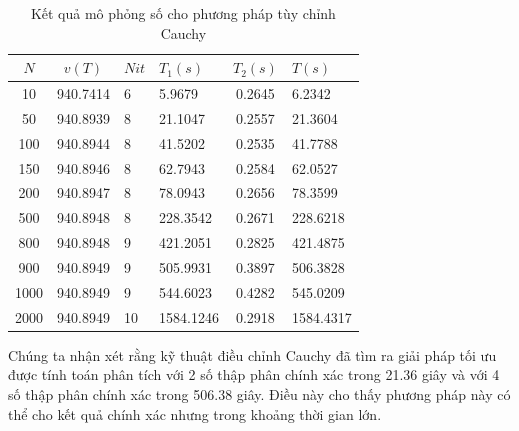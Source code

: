 \documentclass[12pt,a4paper]{report}
\begin{document}
\begin{table}[!htp]
	\centering
	\begin{tabular}{|c|c|l|l|c|l|}
		\hline
		$N$ & $v(T)$ & $Nit$ & $T_1(s)$ & $T_2(s)$ & $T(s)$ \\
		\hline
		10 & 940.7414 & 6 & 5.9679 & 0.2645 & 6.2342 \\
		\hline
		50 & 940.8939 & 8 & 21.1047 & 0.2557 & 21.3604 \\
		\hline
		100 & 940.8944 & 8 & 41.5202 & 0.2535 & 41.7788 \\
		\hline
		150 & 940.8946 & 8 & 62.7943 & 0.2584 & 62.0527 \\
		\hline
		200 & 940.8947 & 8 & 78.0943 & 0.2656 & 78.3599 \\
		\hline
		500 & 940.8948 & 8 & 228.3542 & 0.2671 & 228.6218 \\
		\hline
		800 & 940.8948 & 9 & 421.2051 & 0.2825 & 421.4875 \\
		\hline
		900 & 940.8949 & 9 & 505.9931 & 0.3897 & 506.3828 \\
		\hline
		1000 & 940.8949 & 9 & 544.6023 & 0.4282 & 545.0209 \\
		\hline
		2000 & 940.8949 & 10 & 1584.1246 & 0.2918 & 1584.4317 \\
		\hline
	\end{tabular}
\caption{Kết quả mô phỏng số cho phương pháp tùy chỉnh Cauchy}
\end{table} 
\noindent Chúng ta nhận xét rằng kỹ thuật điều chỉnh Cauchy đã tìm ra giải pháp tối ưu được tính toán phân tích với 2 số thập phân chính xác trong 21.36 giây và với 4 số thập phân chính xác trong 506.38 giây. Điều này cho thấy phương pháp này có thể cho kết quả chính xác nhưng trong khoảng thời gian lớn.
\end{document}
